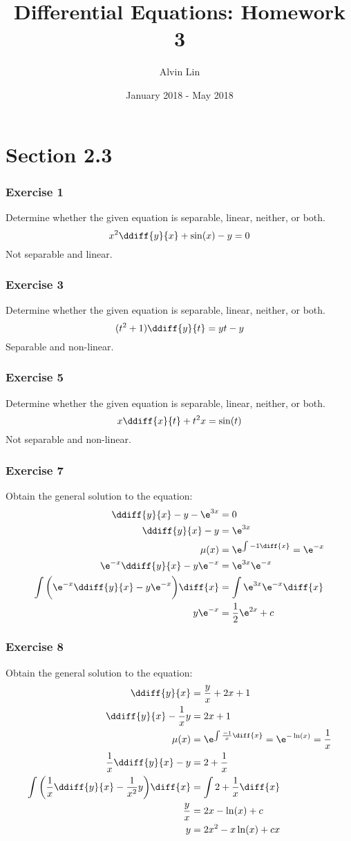 \documentclass{math}
\title{Differential Equations: Homework 3}
\author{Alvin Lin}
\date{January 2018 - May 2018}
\begin{document}
\maketitle

\section*{Section 2.3}

\subsubsection*{Exercise 1}
Determine whether the given equation is separable, linear, neither, or both.
\[ x^2\ddiff{y}{x}+\sin(x)-y = 0 \]
Not separable and linear.

\subsubsection*{Exercise 3}
Determine whether the given equation is separable, linear, neither, or both.
\[ (t^2+1)\ddiff{y}{t} = yt-y \]
Separable and non-linear.

\subsubsection*{Exercise 5}
Determine whether the given equation is separable, linear, neither, or both.
\[ x\ddiff{x}{t}+t^2x = \sin(t) \]
Not separable and non-linear.

\subsubsection*{Exercise 7}
Obtain the general solution to the equation:
\begin{align*}
  \ddiff{y}{x}-y-\e^{3x} &= 0 \\
  \ddiff{y}{x}-y &= \e^{3x} \\
  \mu(x) &= \e^{\int-1\diff{x}} = \e^{-x} \\
  \e^{-x}\ddiff{y}{x}-y\e^{-x} &= \e^{3x}\e^{-x} \\
  \int\bigg(\e^{-x}\ddiff{y}{x}-y\e^{-x}\bigg)\diff{x} &=
    \int\e^{3x}\e^{-x}\diff{x} \\
  y\e^{-x} &= \frac{1}{2}\e^{2x}+c
\end{align*}

\subsubsection*{Exercise 8}
Obtain the general solution to the equation:
\begin{align*}
  \ddiff{y}{x} &= \frac{y}{x}+2x+1 \\
  \ddiff{y}{x}-\frac{1}{x}y &= 2x+1 \\
  \mu(x) &= \e^{\int\frac{-1}{x}\diff{x}} = \e^{-\ln(x)} = \frac{1}{x} \\
  \frac{1}{x}\ddiff{y}{x}-y &= 2+\frac{1}{x} \\
  \int\bigg(\frac{1}{x}\ddiff{y}{x}-\frac{1}{x^2}y\bigg)\diff{x} &=
    \int2+\frac{1}{x}\diff{x} \\
  \frac{y}{x} &= 2x-\ln(x)+c \\
  y &= 2x^2-x\ln(x)+cx
\end{align*}
\end{document}

